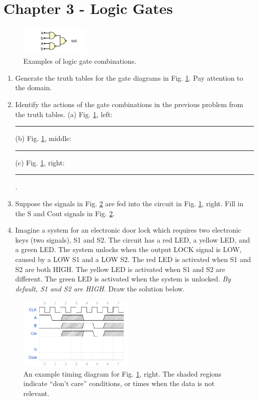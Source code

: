 \documentclass[10pt]{article}
\begin{document}
\section{Chapter 3 - Logic Gates}
\begin{figure}[ht]
\centering
\includegraphics[width=0.3\textwidth]{gateExample1.pdf}
\caption{\label{fig:gates1} Examples of logic gate combinations.}
\end{figure}
\begin{enumerate}
\item Generate the truth tables for the gate diagrams in Fig. \ref{fig:gates1}. Pay attention to the domain.  \\ \vspace{3cm}
\item Identify the actions of the gate combinations in the previous problem from the truth tables.  (a) Fig. \ref{fig:gates1}, left:\rule{3cm}{0.1mm} (b) Fig. \ref{fig:gates1}, middle:\rule{3cm}{0.1mm} (c) Fig. \ref{fig:gates1}, right:\rule{3cm}{0.1mm}.
\item Suppose the signals in Fig. \ref{fig:timing2} are fed into the circuit in Fig. \ref{fig:gates1}, right.  Fill in the S and Cout signals in Fig. \ref{fig:timing2}.
\item Imagine a system for an electronic door lock which requires two electronic keys (two signals), S1 and S2.  The circuit has a red LED, a yellow LED, and a green LED.  The system unlocks when the output LOCK signal is LOW, caused by a LOW S1 and a LOW S2.  The red LED is activated when S1 and S2 are both HIGH.  The yellow LED is activated when S1 and S2 are different.  The green LED is activated when the system is unlocked.  \textit{By default, S1 and S2 are HIGH.} Draw the solution below.  \\ \vspace{4cm}
\end{enumerate}
\begin{figure}[hb]
\centering
\includegraphics[width=0.5\textwidth]{timingExample2.pdf}
\caption{\label{fig:timing2} An example timing diagram for Fig. \ref{fig:gates1}, right.  The shaded regions indicate ``don't care'' conditions, or times when the data is not relevant.}
\end{figure}
\end{document}
